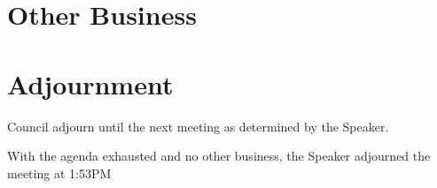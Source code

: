 \documentclass[12pt, letterpaper]{article}
\begin{document}
\hypersetup{} %
\noindent








\section*{Other Business}

\section*{Adjournment}

\begin{motion}
    \birt Council adjourn until the next meeting as determined by the Speaker.
    
    With the agenda exhausted and no other business, the Speaker adjourned the
    meeting at 1:53PM
\end{motion}



\end{document}
